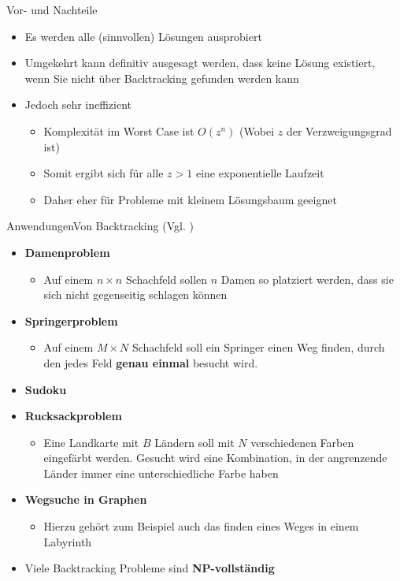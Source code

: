 \begin{frame}{Vor- und Nachteile}
    \begin{itemize}
        \item Es werden alle (sinnvollen) Lösungen ausprobiert
        \item Umgekehrt kann definitiv ausgesagt werden, dass keine Lösung existiert, wenn Sie nicht über Backtracking gefunden werden kann
        \item Jedoch sehr ineffizient
        \begin{itemize}
            \item Komplexität im Worst Case ist $O(z^n)$ (Wobei $z$ der Verzweigungsgrad ist)
            \item Somit ergibt sich für alle $z>1$ eine exponentielle Laufzeit
            \item Daher eher für Probleme mit kleinem Lösungsbaum geeignet
        \end{itemize}
    \end{itemize}
\end{frame}

\begin{frame}[allowframebreaks]{Anwendungen}{Von Backtracking (Vgl. \cite{wiki:backtracking})}
    \begin{itemize}
        \item \textbf{Damenproblem}
        \begin{itemize}
            \item Auf einem $n\times n$ Schachfeld sollen $n$ Damen so platziert werden, dass sie sich nicht gegenseitig schlagen können
        \end{itemize}
        \item \textbf{Springerproblem}
        \begin{itemize}
            \item Auf einem $M\times N$ Schachfeld soll ein Springer einen Weg finden, durch den jedes Feld \textbf{genau einmal} besucht wird.
        \end{itemize}
        \item \textbf{Sudoku}
        \item \textbf{Rucksackproblem}
        \begin{itemize}
            \item Eine Landkarte mit $B$ Ländern soll mit $N$ verschiedenen Farben eingefärbt werden. Gesucht wird eine Kombination, in der angrenzende Länder immer eine unterschiedliche Farbe haben
        \end{itemize}
        \item \textbf{Wegsuche in Graphen}
        \begin{itemize}
            \item Hierzu gehört zum Beispiel auch das finden eines Weges in einem Labyrinth
        \end{itemize}
        \item Viele Backtracking Probleme sind \textbf{NP-vollständig}
    \end{itemize}
\end{frame}